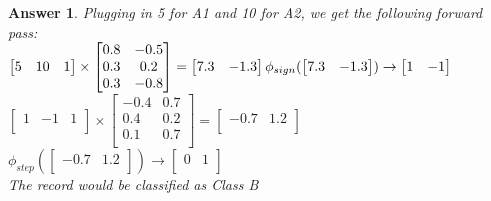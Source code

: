 \documentclass[11pt]{article}
\theoremstyle{description}
\theoremstyle{break}
\newtheorem*{answer}{Answer}
\begin{document}
\begin{answer}
        Plugging in 5 for A1 and 10 for A2, we get the following forward pass:\\
        $\begin{bmatrix}
             5 & 10 & 1 \\
        \end{bmatrix}
        \times
        \begin{bmatrix}
            0.8 & -0.5 \\
            0.3 & 0.2  \\
            0.3 & -0.8 \\
        \end{bmatrix}
        =
        \begin{bmatrix}
            7.3 & -1.3 \\
        \end{bmatrix}\\
        \phi_{sign}(
        \begin{bmatrix}
            7.3 & -1.3 \\
        \end{bmatrix}
        )
        \to
        \begin{bmatrix}
            1 & -1 \\
        \end{bmatrix}$\\
        $\begin{bmatrix}
             1 & -1 & 1 \\
        \end{bmatrix}
        \times
        \begin{bmatrix}
            -0.4 & 0.7 \\
            0.4  & 0.2 \\
            0.1  & 0.7 \\
        \end{bmatrix}
        =
        \begin{bmatrix}
            -0.7 & 1.2 \\
        \end{bmatrix}$\\
        $\phi_{step}(
        \begin{bmatrix}
            -0.7 & 1.2 \\
        \end{bmatrix}
        )
        \to
        \begin{bmatrix}
            0 & 1 \\
        \end{bmatrix}$\\
        The record would be classified as Class B
    \end{answer}
\end{document}
